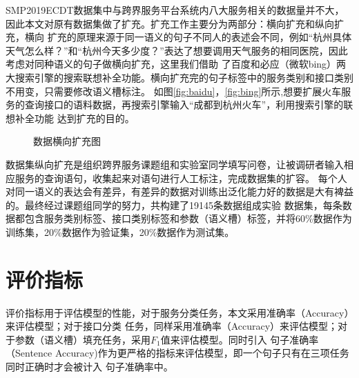 SMP2019ECDT数据集中与跨界服务平台系统内八大服务相关的数据量并不大，因此本文对原有数据集做了扩充。扩充工作主要分为两部分：横向扩充和纵向扩充，横向
扩充的原理来源于同一语义的句子不同人的表述会不同，例如“杭州具体天气怎么样？”和“杭州今天多少度？”表达了想要调用天气服务的相同医院，因此考虑对同种语义的句子做横向扩充，这里我们借助
了百度和必应（微软bing）两大搜索引擎的搜索联想补全功能。横向扩充完的句子标签中的服务类别和接口类别不用变，只需要修改语义槽标注。
如图\ref{fig:baidu}，\ref{fig:bing}所示,想要扩展火车服务的查询接口的语料数据，再搜索引擎输入“成都到杭州火车”，利用搜索引擎的联想补全功能
达到扩充的目的。


  \begin{figure}[htbp]
    \caption{数据横向扩充图}
    
    \end{figure}

数据集纵向扩充是组织跨界服务课题组和实验室同学填写问卷，让被调研者输入相应服务的查询语句，收集起来对语句进行人工标注，完成数据集的扩容。
每个人对同一语义的表达会有差异，有差异的数据对训练出泛化能力好的数据是大有裨益的。最终经过课题组同学的努力，共构建了19145条数据组成实验
数据集，每条数据都包含服务类别标签、接口类别标签和参数（语义槽）标签，并将60\%数据作为训练集，20\%数据作为验证集，20\%数据作为测试集。


\section{评价指标}
评价指标用于评估模型的性能，对于服务分类任务，本文采用准确率（Accuracy）来评估模型；对于接口分类
任务，同样采用准确率（Accuracy）来评估模型；对于参数（语义槽）填充任务，采用$F_1$值来评估模型。同时引入
句子准确率（Sentence Accuracy)作为更严格的指标来评估模型，即一个句子只有在三项任务同时正确时才会被计入
句子准确率中。

